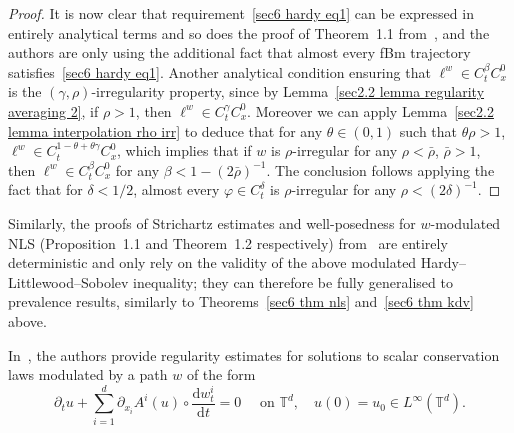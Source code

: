 \documentclass[10pt]{article}
\newcommand{\mathd}{\mathrm{d}}
\begin{document}
\begin{proof}
  It is now clear that requirement~\eqref{sec6 hardy eq1} can be expressed in
  entirely analytical terms and so does the proof of Theorem~1.1
  from~{\cite{duboscq}}, and the authors are only using the additional fact
  that almost every fBm trajectory satisfies~\eqref{sec6 hardy eq1}. Another
  analytical condition ensuring that $\ell^w \in C^{\beta}_t C^0_x$ is the
  $(\gamma, \rho)$\mbox{-}irregularity property, since by Lemma~\ref{sec2.2
  lemma regularity averaging 2}, if $\rho > 1$, then $\ell^w \in C^{\gamma}_t
  C^0_x$. Moreover we can apply Lemma~\ref{sec2.2 lemma interpolation rho irr}
  to deduce that for any $\theta \in (0, 1)$ such that $\theta \rho > 1$,
  $\ell^w \in C^{1 - \theta + \theta \gamma}_t C^0_x$, which implies that if
  $w$ is $\rho$\mbox{-}irregular for any $\rho < \bar{\rho}$, $\bar{\rho} >
  1$, then $\ell^w \in C^{\beta}_t C^0_x$ for any $\beta < 1 - (2
  \bar{\rho})^{- 1}$. The conclusion follows applying the fact that for
  $\delta < 1 / 2$, almost every $\varphi \in C^{\delta}_t$ is
  $\rho$\mbox{-}irregular for any $\rho < (2 \delta)^{- 1}$.
\end{proof}

Similarly, the proofs of Strichartz estimates and well-posedness for
$w$\mbox{-}modulated NLS (Proposition~1.1 and Theorem~1.2 respectively)
from~{\cite{duboscq}} are entirely deterministic and only rely on the validity
of the above modulated Hardy--Littlewood--Sobolev inequality; they can
therefore be fully generalised to prevalence results, similarly to
Theorems~\ref{sec6 thm nls} and~\ref{sec6 thm kdv} above.



In~{\cite{choukgess}}, the authors provide regularity estimates for solutions
to scalar conservation laws modulated by a path $w$ of the form
\begin{equation}
  \partial_t u + \sum_{i = 1}^d \partial_{x_i} A^i (u) \circ \frac{\mathd
  w^i_t}{\mathd t} = 0 \quad \text{ on } \mathbb{T}^d, \quad u (0) = u_0 \in
  L^{\infty} (\mathbb{T}^d) . \label{sec6 gess eq1}
\end{equation}
\end{document}
